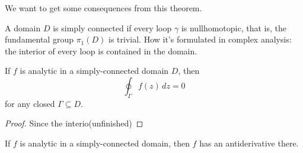 We want to get some consequences from this theorem.
\begin{definition}
    A domain $D$ is simply connected if every loop $\gamma$ is nullhomotopic, that is, the fundamental group $\pi_1(D)$ is trivial. How it's formulated in complex analysis: the interior of every loop is contained in the domain.
\end{definition}
\begin{cor}
    If $f$ is analytic in a simply-connected domain $D$, then \[
        \oint_{\Gamma }^{} f(z) \, dz=0
    \] for any closed $\Gamma \subseteq D$.
\end{cor}
\begin{proof}
    Since the interio(unfinished)
\end{proof}
\begin{cor}
    If $f$ is analytic in a simply-connected domain, then $f$ has an antiderivative there.
\end{cor}
